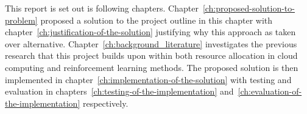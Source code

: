 This report is set out is following chapters. Chapter~\ref{ch:proposed-solution-to-problem} proposed a solution
to the project outline in this chapter with chapter~\ref{ch:justification-of-the-solution} justifying why this
approach as taken over alternative. Chapter~\ref{ch:background_literature} investigates the previous research
that this project builds upon within both resource allocation in cloud computing and reinforcement learning methods.
The proposed solution is then implemented in chapter~\ref{ch:implementation-of-the-solution} with testing and
evaluation in chapters~\ref{ch:testing-of-the-implementation} and~\ref{ch:evaluation-of-the-implementation} respectively.


%
%
%

